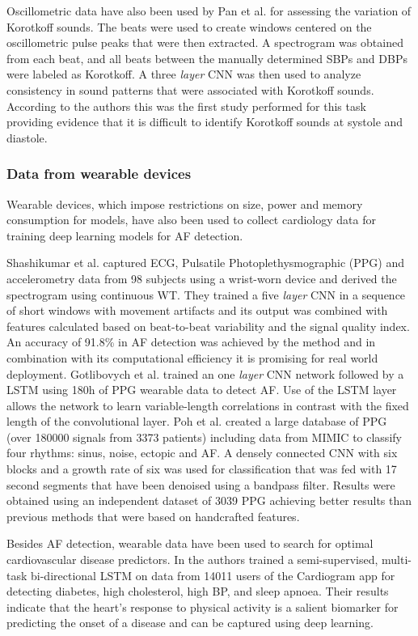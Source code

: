 \documentclass[journal]{IEEEtran}
\begin{document}
Oscillometric data have also been used by Pan et al.\cite{pan2017variation} for assessing the variation of Korotkoff sounds.
The beats were used to create windows centered on the oscillometric pulse peaks that were then extracted.
A spectrogram was obtained from each beat, and all beats between the manually determined SBPs and DBPs were labeled as Korotkoff.
A three \textit{layer} CNN was then used to analyze consistency in sound patterns that were associated with Korotkoff sounds.
According to the authors this was the first study performed for this task providing evidence that it is difficult to identify Korotkoff sounds at systole and diastole.

\subsubsection{Data from wearable devices}
Wearable devices, which impose restrictions on size, power and memory consumption for models, have also been used to collect cardiology data for training deep learning models for AF detection.

Shashikumar et al.\cite{shashikumar2017deep} captured ECG, Pulsatile Photoplethysmographic (PPG) and accelerometry data from 98 subjects using a wrist-worn device and derived the spectrogram using continuous WT\@.
They trained a five \textit{layer} CNN in a sequence of short windows with movement artifacts and its output was combined with features calculated based on beat-to-beat variability and the signal quality index.
An accuracy of 91.8\% in AF detection was achieved by the method and in combination with its computational efficiency it is promising for real world deployment.
Gotlibovych et al.\cite{gotlibovych2018end} trained an one \textit{layer} CNN network followed by a LSTM using 180h of PPG wearable data to detect AF\@.
Use of the LSTM layer allows the network to learn variable-length correlations in contrast with the fixed length of the convolutional layer.
Poh et al.\cite{poh2018diagnostic} created a large database of PPG (over 180000 signals from 3373 patients) including data from MIMIC to classify four rhythms: sinus, noise, ectopic and AF\@.
A densely connected CNN with six blocks and a growth rate of six was used for classification that was fed with 17 second segments that have been denoised using a bandpass filter.
Results were obtained using an independent dataset of 3039 PPG achieving better results than previous methods that were based on handcrafted features.

Besides AF detection, wearable data have been used to search for optimal cardiovascular disease predictors.
In\cite{ballinger2018deepheart} the authors trained a semi-supervised, multi-task bi-directional LSTM on data from 14011 users of the Cardiogram app for detecting diabetes, high cholesterol, high BP, and sleep apnoea.
Their results indicate that the heart's response to physical activity is a salient biomarker for predicting the onset of a disease and can be captured using deep learning.
\end{document}
